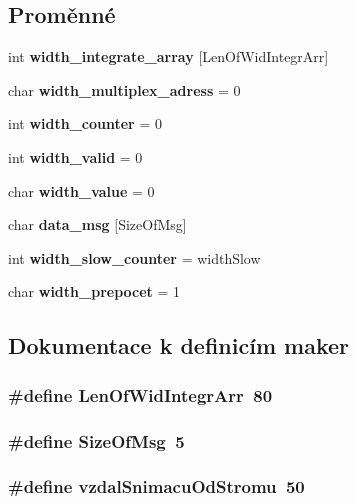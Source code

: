 \subsection*{Proměnné}
\begin{CompactItemize}
\item 
int {\bf width\_\-integrate\_\-array} [LenOfWidIntegrArr]
\item 
char {\bf width\_\-multiplex\_\-adress} = 0
\item 
int {\bf width\_\-counter} = 0
\item 
int {\bf width\_\-valid} = 0
\item 
char {\bf width\_\-value} = 0
\item 
char {\bf data\_\-msg} [SizeOfMsg]
\item 
int {\bf width\_\-slow\_\-counter} = widthSlow
\item 
char {\bf width\_\-prepocet} = 1
\end{CompactItemize}


\subsection{Dokumentace k definicím maker}
\subsubsection{\setlength{\rightskip}{0pt plus 5cm}\#define LenOfWidIntegrArr~80}\label{width_8c_4c8223e37dcdb26f92b32dea5bcdd62e}


\subsubsection{\setlength{\rightskip}{0pt plus 5cm}\#define SizeOfMsg~5}\label{width_8c_8639f3cdce498b36b4f11b82726f3857}


\subsubsection{\setlength{\rightskip}{0pt plus 5cm}\#define vzdalSnimacuOdStromu~50}\label{width_8c_3296643e72916022ad8fff528f9e3841}


